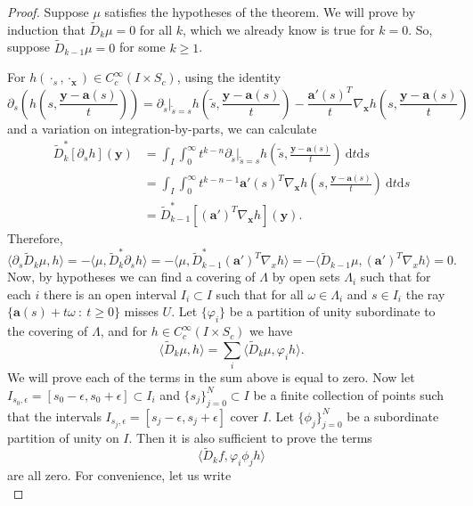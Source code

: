 \documentclass[a4paper,12pt]{amsart}
\numberwithin{equation}{section}
\theoremstyle{plain}
\numberwithin{theorem}{section}
\theoremstyle{definition}
\theoremstyle{remark}
\theoremstyle{remark}
\theoremstyle{remark}
\newcommand{\va}{\mathbf{a}}
\newcommand{\vx}{{\mathbf{x}}}
\newcommand{\vy}{{\mathbf{y}}}
\begin{document}
{\begin{proof}
Suppose $\mu$ satisfies the hypotheses of the theorem. We will prove by induction that $\widetilde{D}_k \mu = 0$ for all $k$, which we already know is true for $k= 0$. So, suppose $\widetilde{D}_{k-1} \mu = 0$ for some $k \geq 1$.

For $h(\cdot_s,\cdot_\vx) \in C_c^\infty(I \times S_c)$, using the identity
\[
\partial_s \left ( h \left ( s , \frac{\vy - \va(s)}{t} \right ) \right ) = \partial_{\widetilde{s}}|_{\widetilde{s} = s} h \left ( \widetilde{s} , \frac{\vy - \va(s)}{t} \right ) - \frac{\va'(s)^T}{t} \nabla_\vx h \left ( s , \frac{\vy - \va(s)}{t} \right )
\]
and a variation on integration-by-parts, we can calculate
\[
\begin{split}
\widetilde{D}_k^* [\partial_sh](\vy) & = \int_I \int_0^\infty t^{k-n} \partial_{\tilde{s}}|_{\tilde{s} = s} h\left ( \tilde{s}, \frac{\vy-\va(s)}{t} \right )\ \mathrm{d}t \mathrm{d}s\\
& =  \int_I \int_0^\infty t^{k-n-1} \va'(s)^T \nabla_\vx h\left ( s, \frac{\vy-\va(s)}{t} \right )\ \mathrm{d}t \mathrm{d}s \\
& = \widetilde{D}_{k-1}^* [(\va')^T \nabla_\vx h](\vy).
\end{split}
\]
Therefore,
\begin{equation}\label{eq:dDkfzero}
\langle \partial_s \widetilde{D}_k \mu, h \rangle = -\langle \mu,\widetilde{D}^*_k \partial_s h \rangle = -\langle \mu,\widetilde{D}^*_{k-1} (\va')^T\nabla_x h \rangle = -\langle \widetilde{D}_{k-1} \mu, (\va')^T\nabla_x h \rangle = 0.
\end{equation}
Now, by hypotheses we can find a covering of $\Lambda$ by open sets $\Lambda_i$ such that for each $i$ there is an open interval $I_i \subset I$ such that for all $\omega \in \Lambda_i$ and $s \in I_i$ the ray $\{\va(s) + t\omega \ :\ t\geq 0\}$ misses $U$. Let $\{\varphi_i\}$ be a partition of unity subordinate to the covering of $\Lambda$, and for $h \in C_c^\infty(I \times S_c)$ we have
\[
\langle \widetilde{D}_k\mu,h \rangle = \sum_{i} \langle \widetilde{D}_k\mu, \varphi_ih \rangle.
\]
We will prove each of the terms in the sum above is equal to zero. Now let $I_{s_0,\epsilon} = [s_0-\epsilon,s_0+\epsilon] \subset I_i$ and $\{s_j\}_{j=0}^N \subset I$ be a finite collection of points such that the intervals $I_{s_j,\epsilon} = [s_j - \epsilon,s_j+\epsilon]$ cover $I$. Let $\{\phi_j\}_{j=0}^N$ be a subordinate partition of unity on $I$. Then it is also sufficient to prove the terms
\[
\langle \widetilde{D}_k f,\varphi_i \phi_j h \rangle
\]
are all zero. For convenience, let us write \[
\]
\end{proof}}
\end{document}
